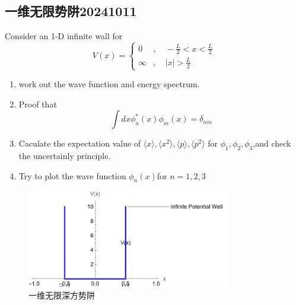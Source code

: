 \documentclass{article}
\newcommand{\expectation}[1]{\langle #1 \rangle}
\begin{document}
\subsection{一维无限势阱20241011}
Consider an 1-D infinite wall for
\[
        V(x)=\begin{cases}
                0&,\quad -\frac{L}{2}<  x<\frac{L}{2} \\
                \infty&,\quad |x|>\frac{L}{2}
            \end{cases}
\]
\begin{enumerate}
    \item work out the wave function and energy spectrum.
    \item Proof that 
    \begin{equation*}
        \int dx \phi_n^{*}(x)\phi_m(x)=\delta_{nm}
    \end{equation*}
    \item Caculate the expectation value of $\expectation{x},\expectation{x^2},\expectation{p},\expectation{p^2}$ for $\phi_1,\phi_2,\phi_3$,and check the uncertainly principle.
    \item Try to plot the wave function $\phi_n(x)$for $n=1,2,3$
\end{enumerate}

\begin{figure}[hbtp]
    \centering
    \includegraphics[width=0.8\textwidth]{figure/一维无线深方势阱.png}
    \caption{一维无限深方势阱}
    \label{fig:一维无限势阱}
\end{figure}
\end{document}
